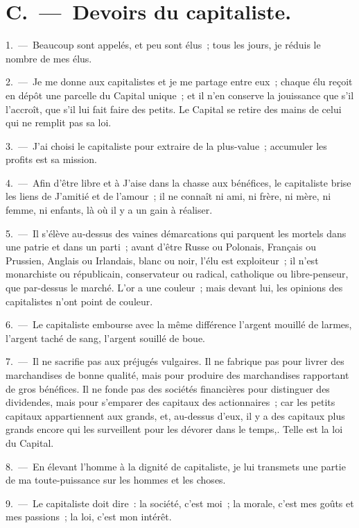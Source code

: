 \documentclass[french,twoside]{book} %
\begin{document}
\section[{C. — Devoirs du capitaliste.}]{C. — Devoirs du capitaliste.}
1. — Beaucoup sont appelés, et peu sont élus ; tous les jours, je réduis le nombre de mes élus.\par
2. — Je me donne aux capitalistes et je me partage entre eux ; chaque élu reçoit en dépôt une parcelle du Capital unique ; et il n’en conserve la jouissance que s’il l’accroît, que s’il lui fait faire des petits. Le Capital se retire des mains de celui qui ne remplit pas sa loi.\par
3. — J'ai choisi le capitaliste pour extraire de la plus-value ; accumuler les profits est sa mission.\par
4. — Afin d’être libre et à J'aise dans la chasse aux bénéfices, le capitaliste brise les liens de J'amitié et de l’amour ; il ne connaît ni ami, ni frère, ni mère, ni femme, ni enfants, là où il y a un gain à réaliser.\par
5. — Il s’élève au-dessus des vaines démarcations qui parquent les mortels dans une patrie et dans un parti ; avant d’être Russe ou Polonais, Français ou Prussien, Anglais ou Irlandais, blanc ou noir, l’élu est exploiteur ; il n’est monarchiste ou républicain, conservateur ou radical, catholique ou libre-penseur, que par-dessus le marché. L'or a une couleur ; mais devant lui, les opinions des capitalistes n’ont point de couleur.\par
6. — Le capitaliste embourse avec la même différence l’argent mouillé de larmes, l’argent taché de sang, l’argent souillé de boue.\par
7. — Il ne sacrifie pas aux préjugés vulgaires. Il ne fabrique pas pour livrer des marchandises de bonne qualité, mais pour produire des marchandises rapportant de gros bénéfices. Il ne fonde pas des sociétés financières pour distinguer des dividendes, mais pour s’emparer des capitaux des actionnaires ; car les petits capitaux appartiennent aux grands, et, au-dessus d’eux, il y a des capitaux plus grands encore qui les surveillent pour les dévorer dans le temps,. Telle est la loi du Capital.\par
8. — En élevant l’homme à la dignité de capitaliste, je lui transmets une partie de ma toute-puissance sur les hommes et les choses.\par
9. — Le capitaliste doit dire : la société, c’est moi ; la morale, c’est mes goûts et mes passions ; la loi, c’est mon intérêt.\par
\end{document}
